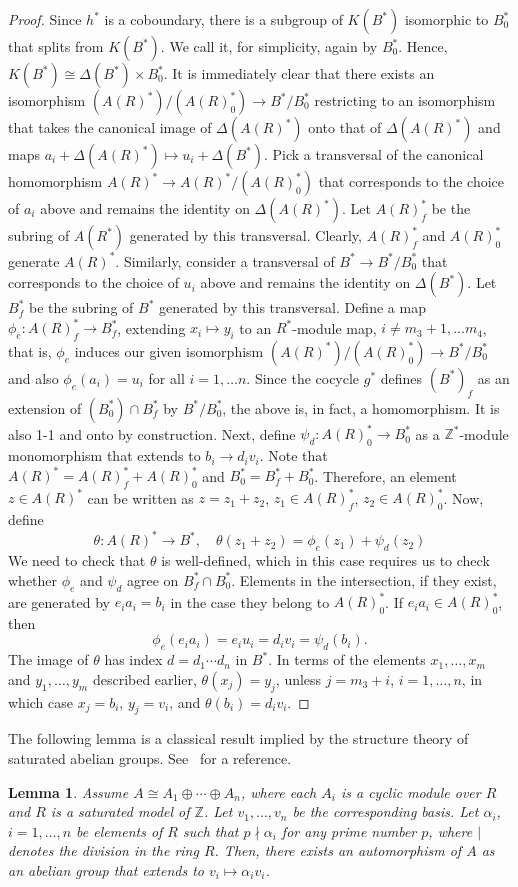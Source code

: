 \documentclass{article}
\newtheorem{lemma}[theorem]{Lemma}
\theoremstyle{remark}
\def\Z{{\mathbb{Z}}}
\begin{document}
\begin{proof}
Since $h^*$ is a coboundary, there is a subgroup of $K(B^*)$ isomorphic to $B_0^*$ that splits from $K(B^*)$. We call it, for simplicity, again by $B_0^*$. Hence, $K(B^*)\cong \Delta(B^*) \times B_0^*$. It is immediately clear that there exists an isomorphism $(A(R)^*)/(A(R)^*_0)\to B^*/B_0^*$ restricting to an isomorphism that takes the canonical image of $\Delta(A(R)^*)$ onto that of $\Delta(A(R)^*)$ and maps $a_i+\Delta(A(R)^*) \mapsto u_i+\Delta(B^*) $. Pick a transversal of the canonical homomorphism $A(R)^* \to A(R)^*/(A(R)^*_0)$ that corresponds to the choice of $a_i$ above and remains the identity on $\Delta(A(R)^*)$. Let $A(R)^*_f$ be the subring of $A(R^*)$ generated by this transversal. Clearly, $A(R)^*_f$ and $A(R)^*_0$ generate $A(R)^*$. Similarly, consider a transversal of $B^* \to B^*/B^*_0$ that corresponds to the choice of $u_i$ above and remains the identity on $\Delta(B^*)$. Let $B^*_f$ be the subring of $B^*$ generated by this transversal. Define a map $\phi_e:A(R)^*_f\to B^*_f$, extending $x_i\mapsto y_i$ to an $R^*$-module map, $i\neq m_3+1, \ldots m_4$, that is, $\phi_e$ induces our given isomorphism  $(A(R)^*)/(A(R)^*_0)\to B^*/B_0^*$ and also $\phi_e(a_i)=u_i$ for all $i=1,\ldots n$. Since the cocycle $g^*$ defines $(B^*)_f$ as an extension of $(B_0^*)\cap B^*_f$ by $B^*/B_0^*$, the above is, in fact, a homomorphism. It is also 1-1 and onto by construction. Next, define $\psi_d:A(R)^*_0 \to B_0^*$ as a $\Z^*$-module monomorphism that extends to $b_i\to d_iv_i$. Note that $A(R)^*=A(R)^*_f + A(R)_0^*$ and $B_0^*= B_f^*+ B_0^*$. Therefore, an element $z\in A(R)^*$ can be written as $z=z_1+z_2$, $z_1\in A(R)^*_f$, $z_2\in A(R)_0^*$. Now, define 
$$ \theta: A(R)^* \to B^*, \quad \theta(z_1+z_2)= \phi_e(z_1)+\psi_d(z_2)$$
We need to check that $\theta$ is well-defined, which in this case requires us to check whether $\phi_e$ and $\psi_d$ agree on $B_f^*\cap B_0^*$. Elements in the intersection, if they exist, are generated by $e_ia_i=b_i$ in the case they belong to $A(R)_0^*$. If $e_ia_i\in A(R)^*_0$, then  $$\phi_e(e_ia_i)= e_iu_i=d_iv_i=\psi_d(b_i).$$  
The image of $\theta$ has index $d=d_1\cdots d_n$ in $B^*$. In terms of the elements $x_1,\ldots, x_m$ and $y_1,\ldots, y_m$ described earlier, 
$\theta(x_j)=y_j$, unless $j=m_3+i$, $i=1, \ldots , n$, in which case $x_j=b_i$, $y_j=v_i$, and $\theta(b_i)=d_iv_i$.
    \end{proof}
    The following lemma is a classical result implied by the structure theory of saturated abelian groups. See~\cite{eklof} for a reference. 
    \begin{lemma}\label{satabelian:lem} Assume $A\cong A_1 \oplus \cdots \oplus A_n$, where each $A_i$ is a cyclic module over $R$ and $R$ is a saturated model of $\Z$. Let $v_1, \ldots ,v_n$ be the corresponding basis. Let $\alpha_i$, $i=1, \ldots, n$ be elements of $R$ such that $p\nmid \alpha_i$ for any prime number $p$, where $|$ denotes the division in the ring $R$. Then, there exists an automorphism of $A$ as an abelian group that extends to $v_i\mapsto \alpha_iv_i$. \end{lemma} 
\end{document}
